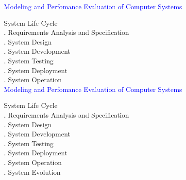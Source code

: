 \documentclass[svgnames]{beamer}
\begin{document}
\newpage
\textcolor{blue}{Modeling and Perfomance Evaluation of Computer Systems} \\[38pt]
\raggedright
\! System Life Cycle\\
. Requirements Analysis and Specification\\
. System Design\\
. System Development\\
. System Testing\\
. System Deployment\\
. System Operation\\[8pt] 

\newpage
\textcolor{blue}{Modeling and Perfomance Evaluation of Computer Systems} \\[38pt]
\raggedright
\! System Life Cycle\\
. Requirements Analysis and Specification\\
. System Design\\
. System Development\\
. System Testing\\
. System Deployment\\
. System Operation\\
. System Evolution\\
\end{document}
